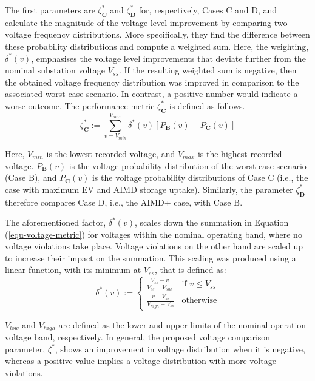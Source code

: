 The first parameters are $\zeta^{*}_\textbf{C}$ and $\zeta^{*}_\textbf{D}$ for, respectively, Cases {C} and {D}, and calculate the magnitude of the voltage level improvement by comparing two voltage frequency distributions. More specifically, they find the difference between these probability distributions and compute a weighted sum. Here, the weighting, $\delta^{*}(v)$, emphasises the voltage level improvements that deviate further from the nominal substation voltage $V_{ss}$. If the resulting weighted sum is negative, then the obtained voltage frequency distribution was improved in comparison to the associated worst case scenario. In contrast, a positive number would indicate a worse outcome. The performance metric $\zeta^{*}_\textbf{C}$ is defined as follows.
\begin{equation}
 \zeta^*_\textbf{C} := \sum_{v = V_{min}}^{V_{max}} \delta^{*}(v) \left[P_\textbf{B}(v) - P_\textbf{C}(v)\right]
 \label{equ-voltage-metric}
\end{equation}

Here, $V_{min}$ is the lowest recorded voltage, and $V_{max}$ is the highest recorded voltage. $P_\textbf{B}(v)$ is the voltage probability distribution of the worst case scenario (Case {B}), and $P_\textbf{C}(v)$ is the voltage probability distributions of Case {C} (i.e., the case with maximum EV and AIMD storage uptake). Similarly, the parameter $\zeta_\textbf{D}^*$ therefore compares Case {D}, i.e., the AIMD+ case, with Case {B}.

The aforementioned factor, $\delta^{*}(v)$, scales down the summation in Equation (\ref{equ-voltage-metric}) for voltages within the nominal operating band, where no voltage violations take place. Voltage violations on the other hand are scaled up to increase their impact on the summation. This scaling was produced using a linear function, with its minimum at $V_{ss}$, that is defined as:
\begin{equation}
 \delta^{*}(v) := 
 \begin{cases} 
 \frac{V_{ss} - v}{V_{ss} - V_{low}} & \text{if } v \leq V_{ss} \\
 \frac{v - V_{ss}}{V_{high} - V_{ss}} & \text{otherwise}
 \end{cases}
\end{equation}

$V_{low}$ and $V_{high}$ are defined as the lower and upper limits of the nominal operation voltage band, respectively. In general, the proposed voltage comparison parameter, $\zeta^*$, shows an improvement in voltage distribution when it is negative, whereas a positive value implies a voltage distribution with more voltage violations.

